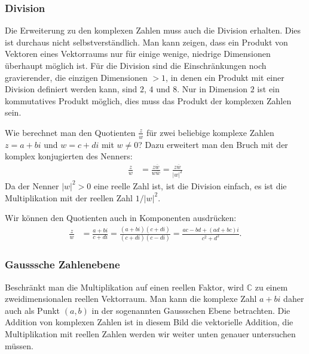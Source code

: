 \subsubsection{Division}
Die Erweiterung zu den komplexen Zahlen muss auch die Division erhalten.
Dies ist durchaus nicht selbstverständlich.
Man kann zeigen, dass ein Produkt von Vektoren eines Vektorraums nur für
einige wenige, niedrige Dimensionen überhaupt möglich ist.
Für die Division sind die Einschränkungen noch gravierender, die einzigen
Dimensionen $>1$, in denen ein Produkt mit einer Division definiert werden
kann, sind $2$, $4$ und $8$.
Nur in Dimension $2$ ist ein kommutatives Produkt möglich, dies muss das
Produkt der komplexen Zahlen sein.

Wie berechnet man den Quotienten $\frac{z}{w}$ für zwei beliebige komplexe
Zahlen $z=a+bi$ und $w=c+di$ mit $w\ne 0$?
Dazu erweitert man den Bruch mit der komplex konjugierten des Nenners:
\begin{align*}
\frac{z}{w}
&=
\frac{z\overline{w}}{w\overline{w}}
=
\frac{z\overline{w}}{|w|^2}
\end{align*}
Da der Nenner $|w|^2>0$ eine reelle Zahl ist, ist die Division einfach,
es ist die Multiplikation mit der reellen Zahl $1/|w|^2$.

Wir können den Quotienten auch in Komponenten ausdrücken:
\begin{align*}
\frac{z}{w}
&=
\frac{a+bi}{c+di}
=
\frac{(a+bi)(c+di)}{(c+di)(c-di)}
=
\frac{ac-bd +(ad+bc)i}{c^2+d^2}.
\end{align*}

\subsubsection{Gausssche Zahlenebene}
Beschränkt man die Multiplikation auf einen reellen Faktor, wird $\mathbb{C}$
zu einem zweidimensionalen reellen Vektorraum.
Man kann die komplexe Zahl $a+bi$ daher auch als Punkt $(a,b)$ in der
sogenannten Gaussschen Ebene betrachten.
Die Addition von komplexen Zahlen ist in diesem Bild die vektorielle
Addition, die Multiplikation mit reellen Zahlen werden wir weiter unten
genauer untersuchen müssen.

